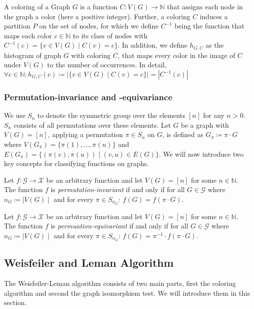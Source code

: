 A coloring of a Graph $G$ is a function $C: V(G) \rightarrow \mathbb{N}$ that assigns each node in the graph a color (here a positive integer). Further, a coloring $C$ induces a partition $P$ on the set of nodes, for which we define $C^{-1}$ being the function that maps each color $c \in \mathbb{N}$ to its class of nodes with $C^{-1}(c) = \{ v\in V(G) \mid C(v) = c\}$. In addition, we define $h_{G, C}$ as the histogram of graph $G$ with coloring $C$, that maps every color in the image of $C$ under $V(G)$ to the number of occurrences. In detail, $\forall c \in \mathbb{N}: h_{G, C}(c) \coloneqq | \{ v \in V(G) \mid C(v) = c  \} | = | C^{-1}(c) |$

\subsubsection{Permutation-invariance and -equivariance}
We use $S_n$ to denote the symmetric group over the elements $[n]$ for any $n > 0$. $S_n$ consists of all permutations over these elements. Let $G$ be a graph with $V(G) = [n]$, applying a permutation $\pi \in S_n$ on $G$, is defined as $G_\pi \coloneqq \pi \cdot G$ where $V(G_\pi) = \{\pi(1), \ldots, \pi(n) \}$ and $E(G_\pi) = \{ (\pi(v), \pi(u)) \mid (v,u) \in E(G)\}$. We will now introduce two key concepts for classifying functions on graphs.

\begin{definition}
    Let $f: \mathcal{G} \rightarrow \mathcal{X}$ be an arbitrary function and let $V(G) = [n]$ for some $n \in \mathbb{N}$. The function $f$ is \textit{permutation-invariant} if and only if for all $G \in \mathcal{G}$ where $n_G \coloneqq \mid V(G) \mid$ and for every $\pi \in S_{n_G}$: $f(G) = f(\pi \cdot G)$.
\end{definition}

\begin{definition}
    Let $f: \mathcal{G} \rightarrow \mathcal{X}$ be an arbitrary function and let $V(G) = [n]$ for some $n \in \mathbb{N}$. The function $f$ is \textit{permuation-equivariant} if and only if for all $G \in \mathcal{G}$ where $n_G \coloneqq \mid V(G) \mid$ and for every $\pi \in S_{n_G}$: $f(G) = \pi^{-1} \cdot f(\pi \cdot G)$.
\end{definition}

\subsection{Weisfeiler and Leman Algorithm}\label{sec:1-WL Definition}
The Weisfeiler-Leman algorithm consists of two main parts, first the coloring algorithm and second the graph isomorphism test. We will introduce them in this section.


